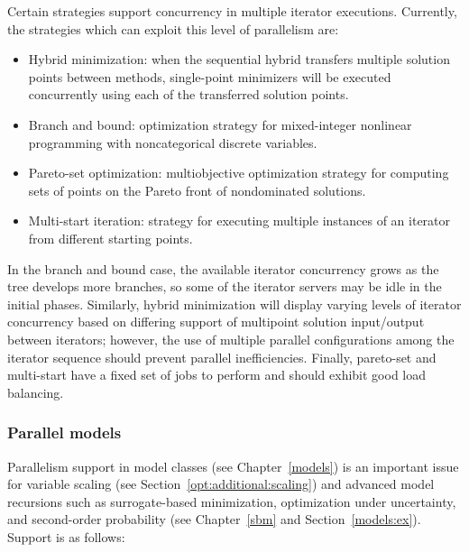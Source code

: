 Certain strategies support concurrency in multiple iterator
executions. Currently, the strategies which can exploit this level of
parallelism are:

\begin{itemize}
\item Hybrid minimization: when the sequential hybrid transfers multiple
solution points between methods, single-point minimizers will be executed
concurrently using each of the transferred solution points.

\item Branch and bound: optimization strategy for mixed-integer nonlinear
programming with noncategorical discrete variables.

\item Pareto-set optimization: multiobjective optimization strategy for
computing sets of points on the Pareto front of nondominated solutions.

\item Multi-start iteration: strategy for executing multiple instances
of an iterator from different starting points.
\end{itemize}

In the branch and bound case, the available iterator concurrency grows
as the tree develops more branches, so some of the iterator servers
may be idle in the initial phases. Similarly, hybrid minimization will
display varying levels of iterator concurrency based on differing
support of multipoint solution input/output between iterators;
however, the use of multiple parallel configurations among the iterator
sequence should prevent parallel inefficiencies.  Finally, pareto-set
and multi-start have a fixed set of jobs to perform and should exhibit
good load balancing.

\subsubsection{Parallel models}\label{parallel:algorithms:models}

Parallelism support in model classes (see Chapter~\ref{models}) is an
important issue for variable scaling (see
Section~\ref{opt:additional:scaling}) and advanced model recursions
such as surrogate-based minimization, optimization under uncertainty,
and second-order probability (see Chapter~\ref{sbm} and
Section~\ref{models:ex}).  Support is as follows:

